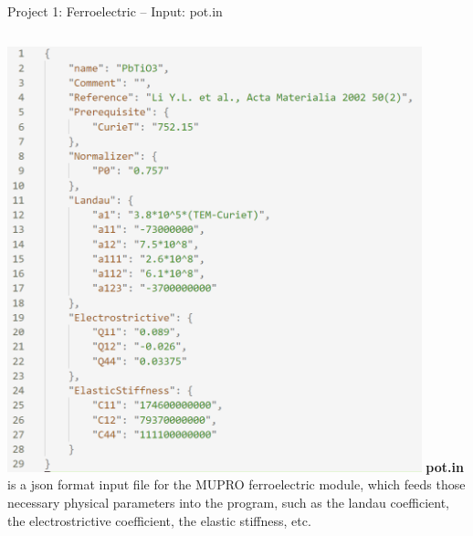 \documentclass[11pt,aspectratio=169]{beamer}
\begin{document}
\begin{frame}[fragile]{Project 1: Ferroelectric -- Input: pot.in}
\begin{columns}
\centering
\vskip 0.5cm
\includegraphics[width=0.9\textwidth]{img/pot.png}
\justify
{\bf pot.in} is a json format input file for the MUPRO ferroelectric module, which feeds those necessary physical parameters into the program, such as the landau coefficient, the electrostrictive coefficient, the elastic stiffness, etc.
\end{columns}
\end{frame}
\end{document}
